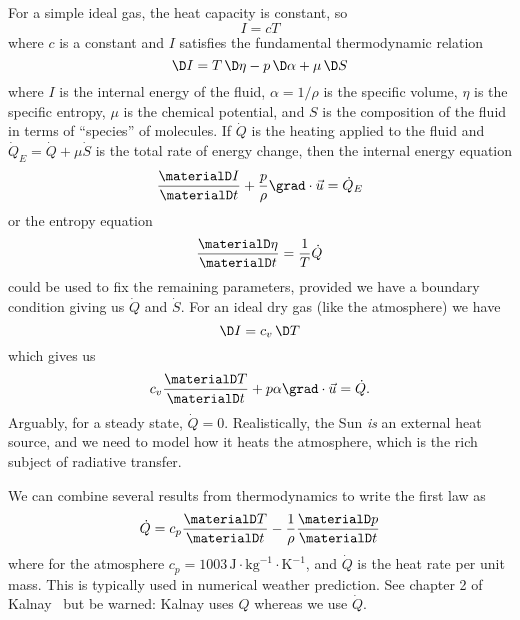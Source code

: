 For a simple ideal gas, the heat capacity is constant, so
\begin{equation}
  I = cT
\end{equation}
where $c$ is a constant and $I$ satisfies the fundamental thermodynamic
relation
\begin{equation}
  \D I = T\,\D\eta - p\,\D\alpha + \mu\,\D S
\end{equation}
where $I$ is the internal energy of the fluid, $\alpha=1/\rho$ is the
specific volume, $\eta$ is the specific entropy, $\mu$ is the chemical
potential, and $S$ is the composition of the fluid in terms of
``species'' of molecules. If $\dot{Q}$ is the heating applied to the
fluid and $\dot{Q}_{E} = \dot{Q} + \mu\dot{S}$ is the total rate of
energy change, then the internal energy equation
\begin{equation}
  \frac{\materialD I}{\materialD t} + \frac{p}{\rho}\grad\cdot\vec{u} = \dot{Q}_{E}
\end{equation}
or the entropy equation
\begin{equation}
\frac{\materialD \eta}{\materialD t} = \frac{1}{T}\dot{Q}
\end{equation}
could be used to fix the remaining parameters, provided we have a
boundary condition giving us $\dot{Q}$ and $\dot{S}$. For an ideal dry
gas (like the atmosphere) we have
\begin{equation}
  \D I = c_{v}\,\D T
\end{equation}
which gives us
\begin{equation}
c_{v}\frac{\materialD T}{\materialD t} + p\alpha\grad\cdot\vec{u} = \dot{Q}.
\end{equation}
Arguably, for a steady state, $\dot{Q}=0$. Realistically, the Sun
\emph{is} an external heat source, and we need to model how it heats the
atmosphere, which is the rich subject of radiative transfer.

\begin{rmk}
  We can combine several results from thermodynamics to write the first
  law as
  \begin{equation}
    \dot{Q} = c_{p}\frac{\materialD T}{\materialD t} - \frac{1}{\rho}\frac{\materialD p}{\materialD t}
  \end{equation}
  where for the atmosphere
  $c_{p}=1003\,\mathrm{J}\cdot\mathrm{kg}^{-1}\cdot\mathrm{K}^{-1}$, and
  $\dot{Q}$ is the heat rate per unit mass. This is typically used in
  numerical weather prediction. See chapter 2 of
  Kalnay~\cite{kalnay_2002} but be warned: Kalnay uses $Q$ whereas we
  use $\dot{Q}$.
\end{rmk}


